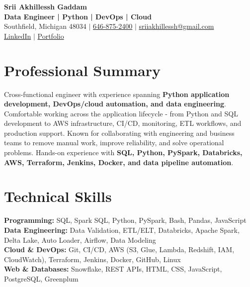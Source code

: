 \documentclass[letterpaper,10pt]{article}
\begin{document}
\fontsize{9.35pt}{10.45pt}\selectfont

\begin{center}
    {\LARGE \textbf{Srii Akhillessh Gaddam}} \\[-1pt]
    \textbf{Data Engineer | Python | DevOps | Cloud} \\[2pt]
    Southfield, Michigan 48034 $|$
    \href{tel:6468752400}{646-875-2400} $|$
    \href{mailto:sriiakhillessh@gmail.com}{sriiakhillessh@gmail.com} \\[1pt]
    \href{https://www.linkedin.com/in/srii-akhiilessh-gaddam-b48668191/}{LinkedIn} $|$
    \href{https://sriiakhillesshg.github.io/portfolio/}{Portfolio}
\end{center}
\vspace{-8pt}

\section{Professional Summary}
\small{Cross-functional engineer with experience spanning \textbf{Python application development, DevOps/cloud automation, and data engineering}. Comfortable working across the application lifecycle - from Python and SQL development to AWS infrastructure, CI/CD, monitoring, ETL workflows, and production support. Known for collaborating with engineering and business teams to remove manual work, improve reliability, and solve operational problems. Hands-on experience with \textbf{SQL, Python, PySpark, Databricks, AWS, Terraform, Jenkins, Docker, and data pipeline automation}.}

\section{Technical Skills}
\small{
\textbf{Programming:} SQL, Spark SQL, Python, PySpark, Bash, Pandas, JavaScript \\
\textbf{Data Engineering:} Data Validation, ETL/ELT, Databricks, Apache Spark, Delta Lake, Auto Loader, Airflow, Data Modeling \\
\textbf{Cloud \& DevOps:} Git, CI/CD, AWS (S3, Glue, Lambda, Redshift, IAM, CloudWatch), Terraform, Jenkins, Docker, GitHub, Linux \\
\textbf{Web \& Databases:} Snowflake, REST APIs, HTML, CSS, JavaScript, PostgreSQL, Greenplum
}

\end{document}
